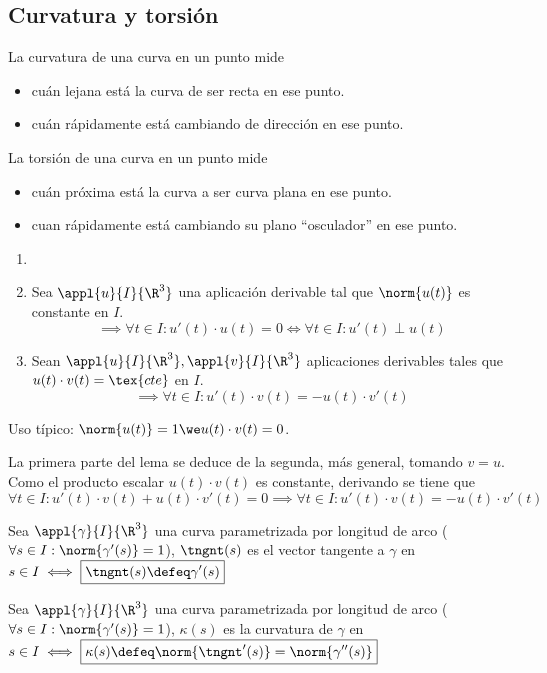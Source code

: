 \subsection{Curvatura y torsión}
La curvatura de una curva en un punto mide
\begin{itemize}[topsep=1pt, itemsep=1pt,parsep=3pt]
	\item cuán lejana está la curva de ser recta en ese punto.
	\item cuán rápidamente está cambiando de dirección en ese punto.
\end{itemize}
La torsión de una curva en un punto mide
\begin{itemize}[topsep=1pt, itemsep=1pt,parsep=3pt]
	\item cuán próxima está la curva a ser curva plana en ese punto.
	\item cuan rápidamente está cambiando su plano “osculador” en ese punto.
\end{itemize}
\begin{lem}
	\begin{enumerate}[topsep=0pt, itemsep=1pt,parsep=3pt]
		\item[] 
		\item Sea $\appl{u}{I}{\R^3}$ una aplicación derivable tal que $\norm{u(t)}$ es constante en $I$.
		\[\implies \forall t \in I : u'(t)\cdot u(t)=0 \iff \forall t \in I : u'(t) \perp u(t)\]
		\item Sean $\appl{u}{I}{\R^3}, \appl{v}{I}{\R^3}$ aplicaciones derivables tales que $u(t)\cdot v(t)=\tex{cte}$ en $I$.
		\[\implies \forall t \in I : u'(t) \cdot v(t)=-u(t)\cdot v'(t)\]
	\end{enumerate}
	Uso típico: $\norm{u(t)}=1 \we u(t)\cdot v(t)=0$.
	\begin{dem}
		La primera parte del lema se deduce de la segunda, más general, tomando $v=u$.
		Como el producto escalar $u(t)\cdot v(t)$ es constante, derivando se tiene que
		\[\forall t \in I : u'(t)\cdot v(t) + u(t)\cdot v'(t) = 0 \implies \forall t \in I : u'(t)\cdot v(t) = - u(t)\cdot v'(t)\]
	\end{dem}
\end{lem}
\begin{defn}
	Sea $\appl{\gamma}{I}{\R^3}$ una curva parametrizada por longitud de arco ($\forall s \in I : \norm{\gamma'(s)}=1$), $\tngnt(s)$ es el vector tangente a $\gamma$ en $s\in I \iff \boxed{\tngnt(s)\defeq \gamma'(s)}$
\end{defn}
\begin{defn}[Curvatura] \label{defnCurvatura}
	Sea $\appl{\gamma}{I}{\R^3}$ una curva parametrizada por longitud de arco ($\forall s \in I : \norm{\gamma'(s)}=1$), $\kappa(s)$ es la curvatura de $\gamma$ en $s \in I \iff \boxed{\kappa(s) \defeq \norm{\tngnt'(s)}=\norm{\gamma''(s)}}$
\end{defn}

